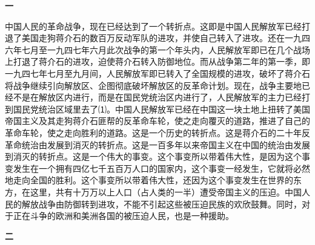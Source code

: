 \documentclass[UTF-8, a5paper, 12pt]{ctexart}
\begin{document}
\textbf{一}

中国人民的革命战争，现在已经达到了一个转折点。这即是中国人民解放军已经打退了美国走狗蒋介石的数百万反动军队的进攻，并使自己转入了进攻。还在一九四六年七月至一九四七年六月此次战争的第一个年头内，人民解放军即已在几个战场上打退了蒋介石的进攻，迫使蒋介石转入防御地位。而从战争第二年的第一季，即一九四七年七月至九月间，人民解放军即已转入了全国规模的进攻，破坏了蒋介石将战争继续引向解放区、企图彻底破坏解放区的反革命计划。现在，战争主要地已经不是在解放区内进行，而是在国民党统治区内进行了，人民解放军的主力已经打到国民党统治区域里去了⑴。中国人民解放军已经在中国这一块土地上扭转了美国帝国主义及其走狗蒋介石匪帮的反革命车轮，使之走向覆灭的道路，推进了自己的革命车轮，使之走向胜利的道路。这是一个历史的转折点。这是蒋介石的二十年反革命统治由发展到消灭的转折点。这是一百多年以来帝国主义在中国的统治由发展到消灭的转折点。这是一个伟大的事变。这个事变所以带着伟大性，是因为这个事变发生在一个拥有四亿七千五百万人口的国家内，这个事变一经发生，它就将必然地走向全国的胜利。这个事变所以带着伟大性，还因为这个事变发生在世界的东方，在这里，共有十万万以上人口（占人类的一半）遭受帝国主义的压迫。中国人民的解放战争由防御转到进攻，不能不引起这些被压迫民族的欢欣鼓舞。同时，对于正在斗争的欧洲和美洲各国的被压迫人民，也是一种援助。

\textbf{二}
\end{document}
